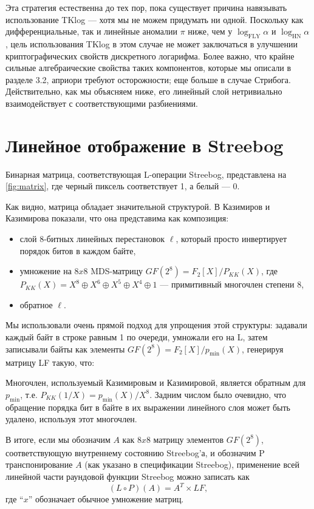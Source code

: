 Эта стратегия естественна до тех пор, пока существует причина навязывать использование
TKlog — хотя мы не можем придумать ни одной. Поскольку как дифференциальные, так и
линейные аномалии \(\pi\) ниже, чем у \(\log_{\text{FLY}} \alpha\) и \(\log_{\text{HN}} \alpha\),
цель использования TKlog в этом случае не может заключаться в улучшении
криптографических свойств дискретного логарифма. Более важно, что крайне
сильные алгебраические свойства таких компонентов, которые мы описали в
разделе 3.2, априори требуют осторожности; еще больше в случае Стрибога.
Действительно, как мы объясняем ниже, его линейный слой нетривиально
взаимодействует с соответствующими разбиениями.

\section{Линейное отображение в Streebog}

Бинарная матрица, соответствующая L-операции Streebog, представлена на \autoref{fig:matrix}, где черный пиксель соответствует 1, а белый — 0.

Как видно, матрица обладает значительной структурой. В \cite{KK13} Казимиров и Казимирова показали, что она представима как композиция:

\begin{itemize}
    \item слой 8-битных линейных перестановок \(\ell\), который просто инвертирует порядок битов в каждом байте,
    \item умножение на $8 x 8$ MDS-матрицу $GF(2^8) = F_2[X]/P_{KK}(X)$, где \(P_{KK}(X) = X^8 \oplus X^6 \oplus X^5 \oplus X^4 \oplus 1\) — примитивный многочлен степени 8,
    \item обратное \(\ell\).
\end{itemize}

Мы использовали очень прямой подход для упрощения этой структуры: задавали каждый байт в строке равным 1 по очереди, умножали его на L, затем записывали байты как элементы $GF(2^8) = F_2[X]/p_{\text{min}}(X)$, генерируя матрицу LF такую, что:

Многочлен, используемый Казимировым и Казимировой, является обратным для \(p_{\text{min}}\), т.е. \(P_{KK}(1/X) = p_{\text{min}}(X)/X^8\). Задним числом было очевидно, что обращение порядка бит в байте в их выражении линейного слоя может быть удалено, используя этот многочлен.

В итоге, если мы обозначим $A$ как $8 x 8$ матрицу элементов $GF(2^8)$, соответствующую внутреннему состоянию Streebog'а, и обозначим P транспонирование $A$ (как указано в спецификации Streebog), применение всей линейной части раундовой функции Streebog можно записать как
\[
(L \circ P)(A) = A^T \times LF,
\]
где “$x$” обозначает обычное умножение матриц.

